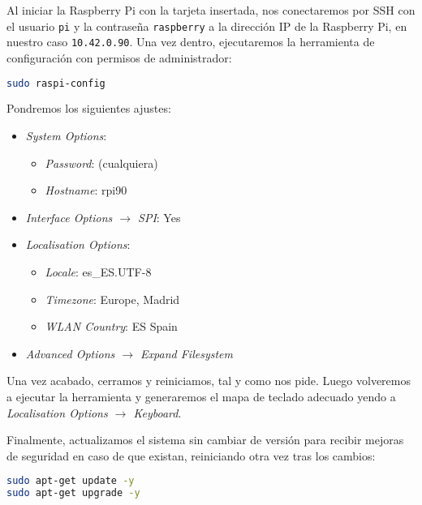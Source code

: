 Al iniciar la Raspberry Pi con la tarjeta insertada, nos conectaremos por SSH
con el usuario \verb|pi| y la contraseña \verb|raspberry| a la dirección IP de
la Raspberry Pi, en nuestro caso \verb|10.42.0.90|. Una vez dentro,
ejecutaremos la herramienta de configuración con permisos de administrador:

\begin{lstlisting}[language=sh]
sudo raspi-config
\end{lstlisting}

Pondremos los siguientes ajustes:

\begin{itemize}
\item \emph{System Options}:
\begin{itemize}
\item \emph{Password}: (cualquiera)
\item \emph{Hostname}: rpi90
\end{itemize}
\item \emph{Interface Options $\rightarrow$ SPI}: Yes
\item \emph{Localisation Options}:
\begin{itemize}
\item \emph{Locale}: es\_ES.UTF-8
\item \emph{Timezone}: Europe, Madrid
\item \emph{WLAN Country}: ES Spain
\end{itemize}
\item \emph{Advanced Options $\rightarrow$ Expand Filesystem}
\end{itemize}

Una vez acabado, cerramos y reiniciamos, tal y como nos pide. Luego volveremos
a ejecutar la herramienta y generaremos el mapa de teclado adecuado yendo a
\emph{Localisation Options $\rightarrow$ Keyboard}.

Finalmente, actualizamos el sistema sin cambiar de versión para recibir mejoras
de seguridad en caso de que existan, reiniciando otra vez tras los cambios:
\begin{lstlisting}[language=sh]
sudo apt-get update -y
sudo apt-get upgrade -y
\end{lstlisting}